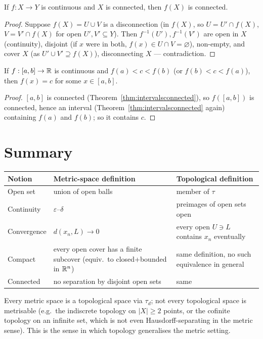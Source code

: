 \begin{proposition}
	If $f:X\to Y$ is continuous and $X$ is connected, then $f(X)$ is connected.
\end{proposition}
\begin{proof}
	Suppose $f(X)=U\cup V$ is a disconnection (in $f(X)$, so $U=U'\cap f(X)$, $V=V'\cap f(X)$ for open $U',V'\subseteq Y$). Then $f^{-1}(U'),f^{-1}(V')$ are open in $X$ (continuity), disjoint (if $x$ were in both, $f(x)\in U\cap V=\varnothing$), non-empty, and cover $X$ (as $U'\cup V'\supseteq f(X)$), disconnecting $X$ — contradiction.
\end{proof}

\begin{corollary}
	If $f:[a,b]\to\mathbb{R}$ is continuous and $f(a)<c<f(b)$ (or $f(b)<c<f(a)$), then $f(x)=c$ for some $x\in[a,b]$.
\end{corollary}
\begin{proof}
	$[a,b]$ is connected (Theorem~\ref{thm:intervalsconnected}), so $f([a,b])$ is connected, hence an interval (Theorem~\ref{thm:intervalsconnected} again) containing $f(a)$ and $f(b)$; so it contains $c$.
\end{proof}

\section{Summary}

\begin{center}
	\begin{tabular}{@{}p{3.2cm}p{5.7cm}p{5.3cm}@{}}
		\toprule
		\textbf{Notion} & \textbf{Metric-space definition} & \textbf{Topological definition}\\
		\midrule
		Open set & union of open balls & member of $\tau$\\
		Continuity & $\varepsilon$--$\delta$ & preimages of open sets open\\
		Convergence & $d(x_n,L)\to0$ & every open $U\ni L$ contains $x_n$ eventually\\
		Compact & every open cover has a finite subcover (equiv.\ to closed+bounded in $\mathbb{R}^n$) & same definition, no such equivalence in general\\
		Connected & no separation by disjoint open sets & same\\
		\bottomrule
	\end{tabular}
\end{center}
Every metric space is a topological space via $\tau_d$; not every topological space is metrisable (e.g.\ the indiscrete topology on $|X|\ge2$ points, or the cofinite topology on an infinite set, which is not even Hausdorff-separating in the metric sense). This is the sense in which topology generalises the metric setting.